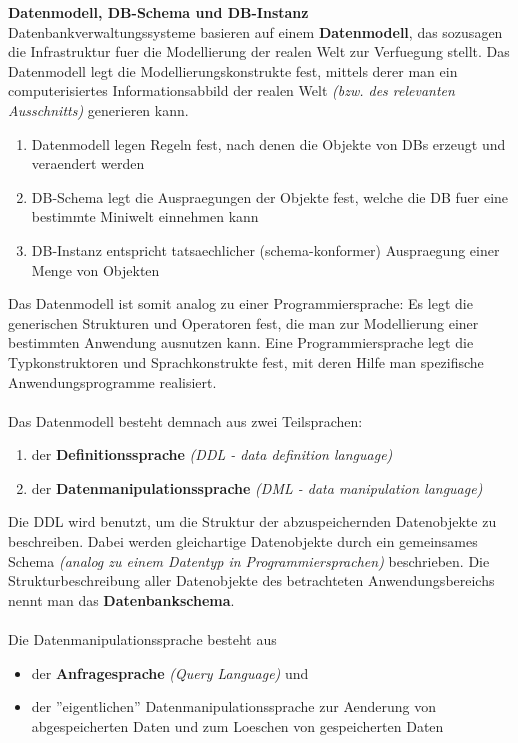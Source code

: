 \documentclass[a4paper,10pt]{article}
\begin{document}
\textbf{Datenmodell, DB-Schema und DB-Instanz}\\
Datenbankverwaltungssysteme basieren auf einem \textbf{Datenmodell}, das sozusagen die Infrastruktur fuer die Modellierung der realen Welt zur Verfuegung stellt. Das Datenmodell legt die Modellierungskonstrukte fest, mittels derer man ein computerisiertes Informationsabbild der realen Welt \emph{(bzw. des relevanten Ausschnitts)} generieren kann.
\begin{enumerate}
\item Datenmodell legen Regeln fest, nach denen die Objekte von DBs erzeugt und veraendert werden
\item DB-Schema legt die Auspraegungen der Objekte fest, welche die DB fuer eine bestimmte Miniwelt einnehmen kann
\item DB-Instanz entspricht tatsaechlicher (schema-konformer) Auspraegung einer Menge von Objekten
\end{enumerate}
Das Datenmodell ist somit analog zu einer Programmiersprache: Es legt die generischen Strukturen und Operatoren fest, die man zur Modellierung einer bestimmten Anwendung ausnutzen kann. Eine Programmiersprache legt die Typkonstruktoren und Sprachkonstrukte fest, mit deren Hilfe man spezifische Anwendungsprogramme realisiert.
\\~\\
Das Datenmodell besteht demnach aus zwei Teilsprachen:
\begin{enumerate}
\item der \textbf{Definitionssprache} \emph{(DDL - data definition language)}
\item der \textbf{Datenmanipulationssprache} \emph{(DML - data manipulation language)}
\end{enumerate}
Die DDL wird benutzt, um die Struktur der abzuspeichernden Datenobjekte zu beschreiben. Dabei werden gleichartige Datenobjekte durch ein gemeinsames Schema \emph{(analog zu einem Datentyp in Programmiersprachen)} beschrieben. Die Strukturbeschreibung aller Datenobjekte des betrachteten Anwendungsbereichs nennt man das \textbf{Datenbankschema}.
\\~\\
Die Datenmanipulationssprache besteht aus
\begin{itemize}
\item der \textbf{Anfragesprache} \emph{(Query Language)} und
\item der ''eigentlichen'' Datenmanipulationssprache zur Aenderung von abgespeicherten Daten und zum Loeschen von gespeicherten Daten
\end{itemize}
\end{document}
